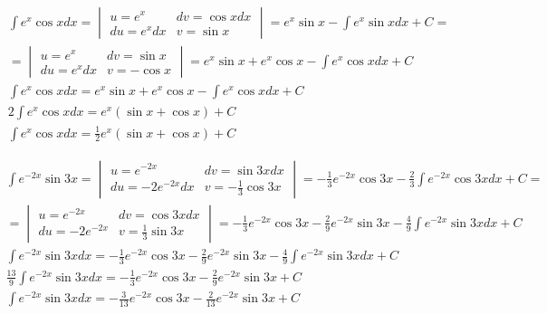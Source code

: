 \begin{gather*}
  \int e^x\cos x dx =
  \begin{vmatrix}
    u=e^x & dv=\cos x dx \\
    du=e^x dx & v=\sin x
  \end{vmatrix}
  = e^x\sin x - \int e^x \sin x dx + C = \\
  = \begin{vmatrix}
    u=e^x & dv=\sin x \\
    du=e^xdx & v=-\cos x
  \end{vmatrix}
  = e^x\sin x + e^x\cos x - \int e^x\cos x dx + C \\
  \int e^x\cos x dx = e^x\sin x + e^x\cos x - \int e^x\cos x dx + C \\
  2 \int e^x\cos x dx = e^x (\sin x + \cos x) + C \\
  \int e^x\cos x dx = \frac{1}{2}e^x (\sin x + \cos x) + C
\end{gather*}


\begin{gather*}
  \int e^{-2x} \sin 3x =
  \begin{vmatrix}
    u=e^{-2x} & dv=\sin 3x dx \\
    du=-2e^{-2x}dx & v=-\frac{1}{3}\cos 3x
  \end{vmatrix}
  = -\frac{1}{3}e^{-2x}\cos 3x - \frac{2}{3} \int e^{-2x}\cos 3x dx + C = \\
  = \begin{vmatrix}
    u=e^{-2x} & dv=\cos 3x dx \\
    du=-2e^{-2x} & v=\frac{1}{3}\sin 3x
  \end{vmatrix}
  = -\frac{1}{3}e^{-2x}\cos 3x - \frac{2}{9}e^{-2x}\sin 3x - \frac{4}{9}\int e^{-2x}\sin 3x dx + C \\
  \int e^{-2x} \sin 3x dx= -\frac{1}{3}e^{-2x}\cos 3x - \frac{2}{9}e^{-2x}\sin 3x - \frac{4}{9}\int e^{-2x}\sin 3x dx + C \\
  \frac{13}{9} \int e^{-2x} \sin 3x dx = -\frac{1}{3}e^{-2x}\cos 3x - \frac{2}{9}e^{-2x}\sin 3x + C \\
  \int e^{-2x} \sin 3x dx = -\frac{3}{13}e^{-2x}\cos 3x - \frac{2}{13}e^{-2x}\sin 3x + C
\end{gather*}



